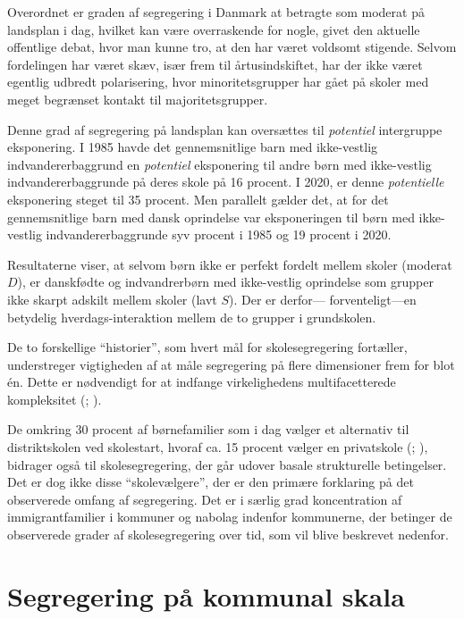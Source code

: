 \documentclass[
]{book}
\begin{document}
Overordnet er graden af segregering i Danmark at betragte som moderat på landsplan i dag, hvilket kan være overraskende for nogle, givet den aktuelle offentlige debat, hvor man kunne tro, at den har været voldsomt stigende. Selvom fordelingen har været skæv, især frem til årtusindskiftet, har der ikke været egentlig udbredt polarisering, hvor minoritetsgrupper har gået på skoler med meget begrænset kontakt til majoritetsgrupper.

Denne grad af segregering på landsplan kan oversættes til \emph{potentiel} intergruppe eksponering. I 1985 havde det gennemsnitlige barn med ikke-vestlig indvandererbaggrund en \emph{potentiel} eksponering til andre børn med ikke-vestlig indvandererbaggrunde på deres skole på 16 procent. I 2020, er denne \emph{potentielle} eksponering steget til 35 procent. Men parallelt gælder det, at for det gennemsnitlige barn med dansk oprindelse var eksponeringen til børn med ikke-vestlig indvandererbaggrunde syv procent i 1985 og 19 procent i 2020.

Resultaterne viser, at selvom børn ikke er perfekt fordelt mellem skoler (moderat \(D\)), er danskfødte og indvandrerbørn med ikke-vestlig oprindelse som grupper ikke skarpt adskilt mellem skoler (lavt \(S\)). Der er derfor--- forventeligt---en betydelig hverdags-interaktion mellem de to grupper i grundskolen.

De to forskellige ``historier'', som hvert mål for skolesegregering fortæller, understreger vigtigheden af at måle segregering på flere dimensioner frem for blot én. Dette er nødvendigt for at indfange virkelighedens multifacetterede kompleksitet (; ).

De omkring 30 procent af børnefamilier som i dag vælger et alternativ til distriktskolen ved skolestart, hvoraf ca. 15 procent vælger en privatskole (; ), bidrager også til skolesegregering, der går udover basale strukturelle betingelser. Det er dog ikke disse ``skolevælgere'', der er den primære forklaring på det observerede omfang af segregering. Det er i særlig grad koncentration af immigrantfamilier i kommuner og nabolag indenfor kommunerne, der betinger de observerede grader af skolesegregering over tid, som vil blive beskrevet nedenfor.

\section{Segregering på kommunal skala}\label{segregering-puxe5-kommunal-skala}
\end{document}
